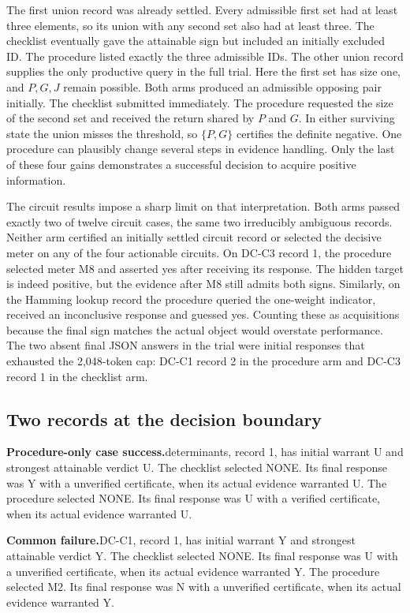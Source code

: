 \documentclass[12pt,letterpaper]{article}
\newcommand{\reading}[2]{\par\smallskip\textsf{\color{accent}\bfseries #1}\enspace #2\par}
\begin{document}
The first union record was already settled. Every admissible first set had at least three elements, so its union with any second set also had at least three. The checklist eventually gave the attainable sign but included an initially excluded ID. The procedure listed exactly the three admissible IDs. The other union record supplies the only productive query in the full trial. Here the first set has size one, and $P,G,J$ remain possible. Both arms produced an admissible opposing pair initially. The checklist submitted immediately. The procedure requested the size of the second set and received the return shared by $P$ and $G$. In either surviving state the union misses the threshold, so $\{P,G\}$ certifies the definite negative. One procedure can plausibly change several steps in evidence handling. Only the last of these four gains demonstrates a successful decision to acquire positive information.

The circuit results impose a sharp limit on that interpretation. Both arms passed exactly two of twelve circuit cases, the same two irreducibly ambiguous records. Neither arm certified an initially settled circuit record or selected the decisive meter on any of the four actionable circuits. On DC-C3 record 1, the procedure selected meter M8 and asserted yes after receiving its response. The hidden target is indeed positive, but the evidence after M8 still admits both signs. Similarly, on the Hamming lookup record the procedure queried the one-weight indicator, received an inconclusive response and guessed yes. Counting these as acquisitions because the final sign matches the actual object would overstate performance. The two absent final JSON answers in the trial were initial responses that exhausted the 2,048-token cap: DC-C1 record 2 in the procedure arm and DC-C3 record 1 in the checklist arm.

\subsection{Two records at the decision boundary}

\reading{Procedure-only case success.}{determinants, record 1, has initial warrant U and strongest attainable verdict U. The checklist selected NONE. Its final response was Y with a unverified certificate, when its actual evidence warranted U. The procedure selected NONE. Its final response was U with a verified certificate, when its actual evidence warranted U.}

\reading{Common failure.}{DC-C1, record 1, has initial warrant Y and strongest attainable verdict Y. The checklist selected NONE. Its final response was U with a unverified certificate, when its actual evidence warranted Y. The procedure selected M2. Its final response was N with a unverified certificate, when its actual evidence warranted Y.}
\end{document}

